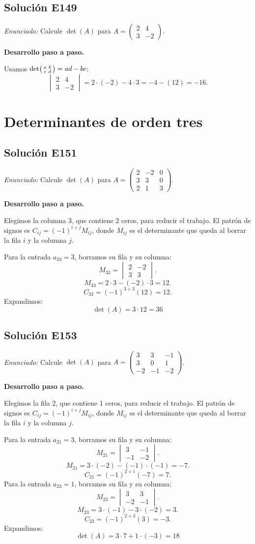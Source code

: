 \documentclass[12pt]{article}
\theoremstyle{remark}
\newcommand{\solucion}[2]{\Needspace{11\baselineskip}\subsection*{Solución E#1}\noindent\textit{Enunciado:} #2\par\medskip\noindent\textbf{Desarrollo paso a paso.}\par\medskip}
\begin{document}
\medskip

\solucion{149}{Calcule $\det(A)$ para $A=\begin{pmatrix}2&4\\3&-2\end{pmatrix}$.}
Usamos $\det\begin{psmallmatrix}a&b\\c&d\end{psmallmatrix}=ad-bc$:
\[
\begin{vmatrix}2&4\\3&-2\end{vmatrix}=2\cdot (-2)-4\cdot 3=-4-(12)=-16.
\]

\medskip

\section{Determinantes de orden tres}

\solucion{151}{Calcule $\det(A)$ para $A=\begin{pmatrix}2&-2&0\\3&3&0\\2&1&3\end{pmatrix}$.}
Elegimos la columna 3, que contiene 2 ceros, para reducir el trabajo. El patrón de signos es $C_{ij}=(-1)^{i+j}M_{ij}$, donde $M_{ij}$ es el determinante que queda al borrar la fila $i$ y la columna $j$.

Para la entrada $a_{33}=3$, borramos su fila y su columna:
\[
M_{33}=\begin{vmatrix}2&-2\\3&3\end{vmatrix}.
\]
\[
M_{33}=2\cdot 3-(-2)\cdot 3=12.
\]
\[
C_{33}=(-1)^{3+3}(12)=12.
\]
Expandimos: \[
\boxed{\det(A)=3\cdot 12=36}
\]

\medskip

\solucion{153}{Calcule $\det(A)$ para $A=\begin{pmatrix}3&3&-1\\3&0&1\\-2&-1&-2\end{pmatrix}$.}
Elegimos la fila 2, que contiene 1 ceros, para reducir el trabajo. El patrón de signos es $C_{ij}=(-1)^{i+j}M_{ij}$, donde $M_{ij}$ es el determinante que queda al borrar la fila $i$ y la columna $j$.

Para la entrada $a_{21}=3$, borramos su fila y su columna:
\[
M_{21}=\begin{vmatrix}3&-1\\-1&-2\end{vmatrix}.
\]
\[
M_{21}=3\cdot (-2)-(-1)\cdot (-1)=-7.
\]
\[
C_{21}=(-1)^{2+1}(-7)=7.
\]
Para la entrada $a_{23}=1$, borramos su fila y su columna:
\[
M_{23}=\begin{vmatrix}3&3\\-2&-1\end{vmatrix}.
\]
\[
M_{23}=3\cdot (-1)-3\cdot (-2)=3.
\]
\[
C_{23}=(-1)^{2+3}(3)=-3.
\]
Expandimos: \[
\boxed{\det(A)=3\cdot 7 + 1\cdot (-3)=18}
\]
\end{document}
